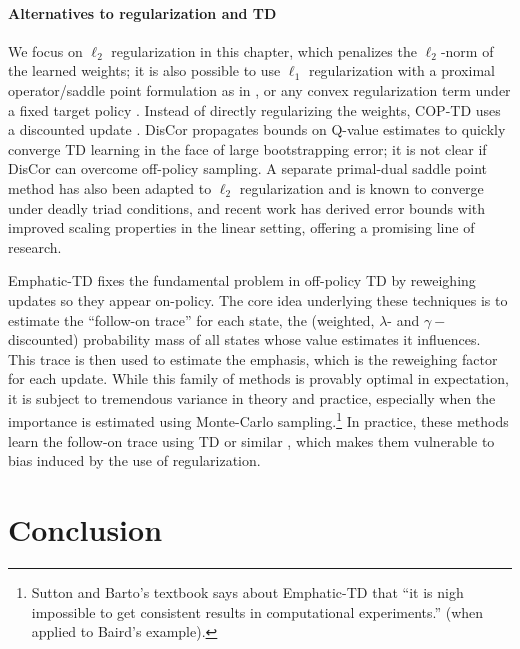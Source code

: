 \paragraph{Alternatives to regularization and TD}
We focus on $\ell_2$ regularization in this chapter, which penalizes the $\ell_2$-norm of the learned weights; it is also possible to use $\ell_1$ regularization with a proximal operator/saddle point formulation as in \cite{mahadevan2014proximal}, or any convex regularization term under a fixed target policy \cite{yu2017convergence}. Instead of directly regularizing the weights, COP-TD uses a discounted update \cite{gelada2019off}. DisCor \cite{kumar2020discor} propagates bounds on Q-value estimates to quickly converge TD learning in the face of large bootstrapping error; it is not clear if DisCor can overcome off-policy sampling. A separate primal-dual saddle point method has also been adapted to $\ell_2$ regularization \cite{du2017stochastic} and is known to converge under deadly triad conditions, and recent work \cite{chaudhuri2022first} has derived error bounds with improved scaling properties in the linear setting, offering a promising line of research.

Emphatic-TD \cite{sutton2016emphatic} fixes the fundamental problem in off-policy TD by reweighing updates so they appear on-policy. The core idea underlying these techniques is to estimate the ``follow-on trace'' for each state, the (weighted, $\lambda$- and $\gamma-$discounted) probability mass of all states whose value estimates it influences. This trace is then used to estimate the emphasis, which is the reweighing factor for each update. While this family of methods is provably optimal in expectation, it is subject to tremendous variance in theory and practice, especially when the importance is estimated using Monte-Carlo sampling.\footnote{Sutton and Barto's textbook \cite{sutton2020reinforcement} says about Emphatic-TD that ``it is
  nigh impossible to get consistent results in computational experiments.'' (when applied to Baird's example). } In practice, these methods learn the follow-on trace using TD \cite{jiang2021learning,zhang2020provably} or similar \cite{hasselt2021expected}, which makes them vulnerable to bias induced by the use of regularization.

\section{Conclusion}

